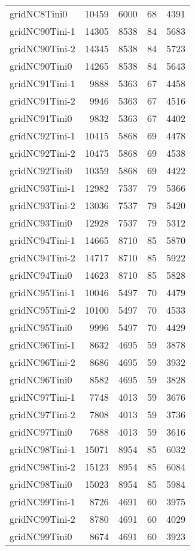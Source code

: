 \begin{longtable}{lrrrr}
gridNC8Tini0 & 10459 & 6000 & 68 & 4391 \\
gridNC90Tini-1 & 14305 & 8538 & 84 & 5683 \\
gridNC90Tini-2 & 14345 & 8538 & 84 & 5723 \\
gridNC90Tini0 & 14265 & 8538 & 84 & 5643 \\
gridNC91Tini-1 & 9888 & 5363 & 67 & 4458 \\
gridNC91Tini-2 & 9946 & 5363 & 67 & 4516 \\
gridNC91Tini0 & 9832 & 5363 & 67 & 4402 \\
gridNC92Tini-1 & 10415 & 5868 & 69 & 4478 \\
gridNC92Tini-2 & 10475 & 5868 & 69 & 4538 \\
gridNC92Tini0 & 10359 & 5868 & 69 & 4422 \\
gridNC93Tini-1 & 12982 & 7537 & 79 & 5366 \\
gridNC93Tini-2 & 13036 & 7537 & 79 & 5420 \\
gridNC93Tini0 & 12928 & 7537 & 79 & 5312 \\
gridNC94Tini-1 & 14665 & 8710 & 85 & 5870 \\
gridNC94Tini-2 & 14717 & 8710 & 85 & 5922 \\
gridNC94Tini0 & 14623 & 8710 & 85 & 5828 \\
gridNC95Tini-1 & 10046 & 5497 & 70 & 4479 \\
gridNC95Tini-2 & 10100 & 5497 & 70 & 4533 \\
gridNC95Tini0 & 9996 & 5497 & 70 & 4429 \\
gridNC96Tini-1 & 8632 & 4695 & 59 & 3878 \\
gridNC96Tini-2 & 8686 & 4695 & 59 & 3932 \\
gridNC96Tini0 & 8582 & 4695 & 59 & 3828 \\
gridNC97Tini-1 & 7748 & 4013 & 59 & 3676 \\
gridNC97Tini-2 & 7808 & 4013 & 59 & 3736 \\
gridNC97Tini0 & 7688 & 4013 & 59 & 3616 \\
gridNC98Tini-1 & 15071 & 8954 & 85 & 6032 \\
gridNC98Tini-2 & 15123 & 8954 & 85 & 6084 \\
gridNC98Tini0 & 15023 & 8954 & 85 & 5984 \\
gridNC99Tini-1 & 8726 & 4691 & 60 & 3975 \\
gridNC99Tini-2 & 8780 & 4691 & 60 & 4029 \\
gridNC99Tini0 & 8674 & 4691 & 60 & 3923 \\

\end{longtable}
